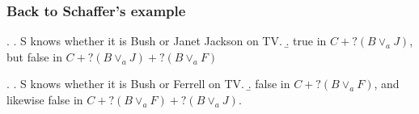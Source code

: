 
\begin{frame}

\frametitle{Back to Schaffer's example}



\ex.\label{bj} \a. S knows whether it is Bush or Janet Jackson on
TV. \b. true in $C + ?(B \vee_a J)$, but false in $C +  ?(B \vee_a
J) + ?(B \vee_a F)$

\ex.\label{bf} \a. S knows whether it is Bush or Ferrell on TV.
\b. false in $C + ?(B \vee_a F)$, and likewise false in $C + ?(B
\vee_a F) + ?(B\vee_a J)$.


\end{frame}
